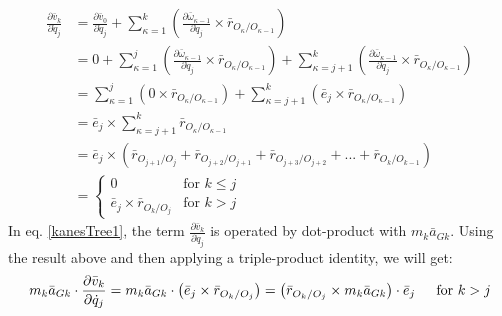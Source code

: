 \documentclass[a4paper,10pt]{article}
\begin{document}
\begin{align}
 \frac{\partial \bar{v}_k}{\partial \dot{q}_j} &= \frac{\partial \bar{v}_0}{\partial \dot{q}_j} + \sum\limits_{\kappa=1}^k \left( \frac{\partial \bar\omega_{\kappa-1}}{\partial \dot{q}_j} \times \bar{r}_{O_\kappa/O_{\kappa-1}} \right) \nonumber \\
 &= 0 + \sum\limits_{\kappa=1}^{j} \left( \frac{\partial \bar\omega_{\kappa-1}}{\partial \dot{q}_j} \times \bar{r}_{O_\kappa/O_{\kappa-1}} \right) 
       + \sum\limits_{\kappa=j+1}^k \left( \frac{\partial \bar\omega_{\kappa-1}}{\partial \dot{q}_j} \times \bar{r}_{O_\kappa/O_{\kappa-1}} \right) \nonumber \\
 &= \sum\limits_{\kappa=1}^{j} \left( 0 \times \bar{r}_{O_\kappa/O_{\kappa-1}} \right) + \sum\limits_{\kappa=j+1}^k \left( \bar{e}_j \times \bar{r}_{O_\kappa/O_{\kappa-1}} \right) \nonumber \\
 &= \bar{e}_j \times \sum\limits_{\kappa=j+1}^k \bar{r}_{O_\kappa/O_{\kappa-1}} \nonumber \\
 &= \bar{e}_j \times \left( \bar{r}_{O_{j+1}/O_j} + \bar{r}_{O_{j+2}/O_{j+1}} + \bar{r}_{O_{j+3}/O_{j+2}} + ... + \bar{r}_{O_k/O_{k-1}}\right) \nonumber \\
 &= \begin{cases}
     0  & \mbox{for } k \leq j \\
     \bar{e}_j \times \bar{r}_{O_k/O_j} & \mbox{for } k > j
    \end{cases}
\end{align}
In eq. \ref{kanesTree1}, the term $\frac{\partial \bar{v}_k}{\partial \dot{q}_j}$ is operated by dot-product with $m_k\bar{a}_{Gk}$. Using the result above and then applying a triple-product identity, we will get:
\[
 m_k\bar{a}_{Gk} \cdot \frac{\partial \bar{v}_k}{\partial \dot{q}_j} = m_k\bar{a}_{Gk} \cdot \left( \bar{e}_j \times \bar{r}_{O_k/O_j} \right) 
 = \left(\bar{r}_{O_k/O_j} \times m_k\bar{a}_{Gk} \right) \cdot \bar{e}_j \hskip 15pt \mbox{for } k > j
\]
\end{document}
